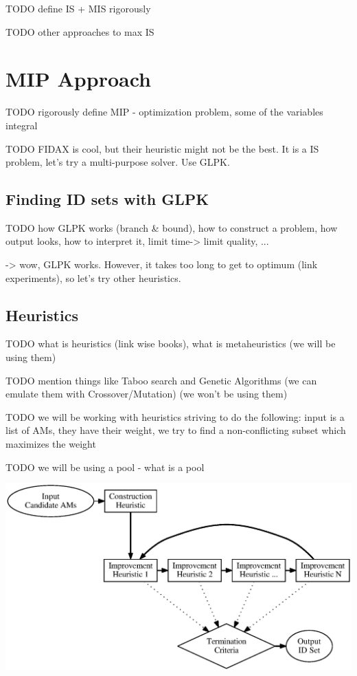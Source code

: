 \documentclass[a4paper,12pt,oneside]{report}
\begin{document}
TODO define IS + MIS rigorously

TODO other approaches to max IS

\chapter{MIP Approach}

TODO rigorously define MIP - optimization problem, some of the variables integral

TODO FIDAX is cool, but their heuristic might not be the best. It is a IS problem, let's try a multi-purpose solver. Use GLPK. 

\section{Finding ID sets with GLPK}

TODO how GLPK works (branch \& bound), how to construct a problem, how output looks, how to interpret it, limit time-> limit quality, ...
 
 -> wow, GLPK works. However, it takes too long to get to optimum (link experiments), so let's try other heuristics.
 
\section{Heuristics}

TODO what is heuristics (link wise books), what is metaheuristics (we will be using them)

TODO mention things like Taboo search and Genetic Algorithms (we can emulate them with Crossover/Mutation) (we won't be using them)

TODO we will be working with heuristics striving to do the following: input is a list of AMs, they have their weight, we try to find a non-conflicting subset which maximizes the weight

TODO we will be using a pool - what is a pool

\begin{center}
  \includegraphics[width=\textwidth]{images/metaheuristic.eps}
\end{center}
\end{document}
